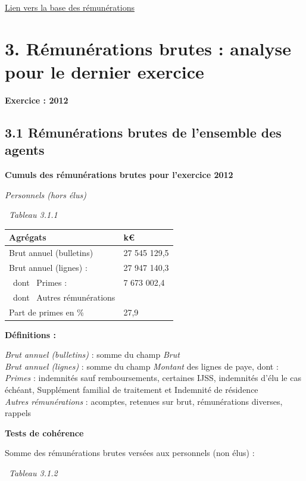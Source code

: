 \href{../Bases/Remunerations/Analyse.remunerations.csv}{Lien vers la base
des rémunérations}

\newpage

\hypertarget{remunerations-brutes-analyse-pour-le-dernier-exercice}{%
\section{3. Rémunérations brutes : analyse pour le dernier
exercice}\label{remunerations-brutes-analyse-pour-le-dernier-exercice}}

\textbf{Exercice : 2012 }

\hypertarget{remunerations-brutes-de-lensemble-des-agents-1}{%
\subsection{3.1 Rémunérations brutes de l'ensemble des
agents}\label{remunerations-brutes-de-lensemble-des-agents-1}}

\textbf{Cumuls des rémunérations brutes pour l'exercice 2012 }

\emph{Personnels (hors élus)}

~\emph{Tableau 3.1.1}

\begin{longtable}[]{@{}ll@{}}
\toprule
Agrégats & k€\tabularnewline
\midrule
\endhead
Brut annuel (bulletins) & 27 545 129,5\tabularnewline
Brut annuel (lignes) : & 27 947 140,3\tabularnewline
~dont ~Primes : & 7 673 002,4\tabularnewline
~dont ~Autres rémunérations &\tabularnewline
Part de primes en \% & 27,9\tabularnewline
\bottomrule
\end{longtable}

\textbf{Définitions :}

\emph{Brut annuel (bulletins)} : somme du champ \emph{Brut}\\
\emph{Brut annuel (lignes)} : somme du champ \emph{Montant} des lignes
de paye, dont :\\
\emph{Primes} : indemnités sauf remboursements, certaines IJSS,
indemnités d'élu le cas échéant, Supplément familial de traitement et
Indemnité de résidence\\
\emph{Autres rémunérations} : acomptes, retenues sur brut, rémunérations
diverses, rappels

\textbf{Tests de cohérence}

Somme des rémunérations brutes versées aux personnels (non élus) :

~\emph{Tableau 3.1.2}

